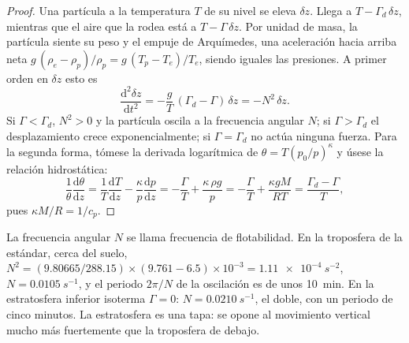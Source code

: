 \begin{proof}
Una partícula a la temperatura $T$ de su nivel se eleva $\delta z$. Llega a
$T - \Gamma_d\,\delta z$, mientras que el aire que la rodea está a $T - \Gamma\,\delta z$.
Por unidad de masa, la partícula siente su peso y el empuje de Arquímedes, una aceleración hacia arriba neta
$g\,(\rho_e - \rho_p)/\rho_p = g\,(T_p - T_e)/T_e$, siendo iguales las presiones. A primer orden en $\delta z$ esto es
\[
  \frac{\mathrm d^2 \delta z}{\mathrm dt^2} = -\frac{g}{T}\,(\Gamma_d - \Gamma)\,\delta z = -N^2\,\delta z .
\]
Si $\Gamma < \Gamma_d$, $N^2 > 0$ y la partícula oscila a la frecuencia angular
$N$; si $\Gamma > \Gamma_d$ el desplazamiento crece exponencialmente; si
$\Gamma = \Gamma_d$ no actúa ninguna fuerza. Para la segunda forma, tómese la derivada logarítmica de $\theta = T (p_0/p)^{\kappa}$ y úsese la relación hidrostática:
\[
  \frac{1}{\theta}\frac{\mathrm d\theta}{\mathrm dz} = \frac{1}{T}\frac{\mathrm dT}{\mathrm dz}
  - \frac{\kappa}{p}\frac{\mathrm dp}{\mathrm dz} = -\frac{\Gamma}{T} + \frac{\kappa\,\rho g}{p}
  = -\frac{\Gamma}{T} + \frac{\kappa g M}{RT} = \frac{\Gamma_d - \Gamma}{T},
\]
pues $\kappa M/R = 1/c_p$.
\end{proof}

La frecuencia angular $N$ se llama frecuencia de flotabilidad. En la troposfera
de la estándar, cerca del suelo, $N^2 = (9.80665/288.15) \times (9.761 -
6.5)\times10^{-3} = \qty{1.11e-4}{s^{-2}}$, $N = \qty{0.0105}{s^{-1}}$, y el periodo $2\pi/N$ de la oscilación es de unos \qty{10}{min}. En la estratosfera inferior isoterma $\Gamma = 0$: $N = \qty{0.0210}{s^{-1}}$, el doble, con un periodo de cinco minutos. La estratosfera es una tapa: se opone al movimiento vertical mucho más fuertemente que la troposfera de debajo.

